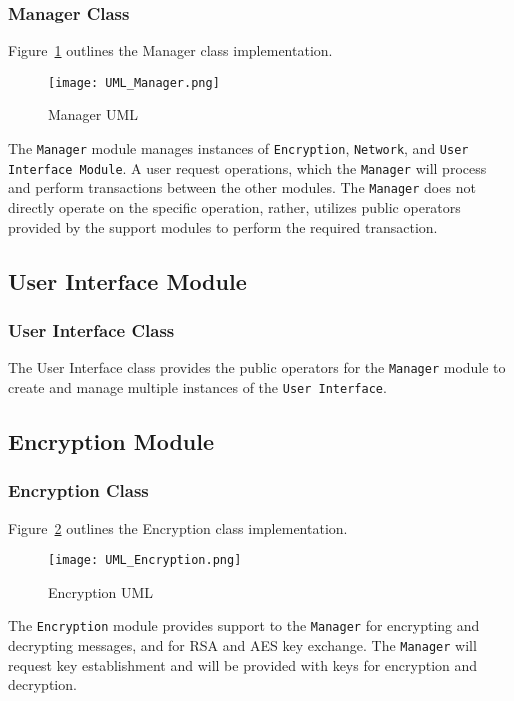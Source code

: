 \documentclass[sigconf]{acmart}
\begin{document}
\subsubsection{Manager Class}
Figure~\ref{Manager UML} outlines the Manager class implementation.
\begin{figure}[htb]
	\begin{center}
		\texttt{[image: UML\_Manager.png]}
		\caption{Manager UML}
		\label{Manager UML}
	\end{center}
\end{figure}
The \texttt{Manager} module manages instances of \texttt{Encryption}, \texttt{Network}, and
\texttt{User Interface Module}. A user request operations, which the \texttt{Manager} will
process and perform transactions between the other modules. The \texttt{Manager} does not directly
operate on the specific operation, rather, utilizes public operators provided by the support
modules to perform the required transaction.

\subsection{User Interface Module}
\subsubsection{User Interface Class}
The User Interface class provides the public operators for the \texttt{Manager} module to create
and manage multiple instances of the \texttt{User Interface}.

\subsection{Encryption Module}
\subsubsection{Encryption Class}
Figure~\ref{Encryption UML} outlines the Encryption class implementation.
\begin{figure}[htb]
	\begin{center}
		\texttt{[image: UML\_Encryption.png]}
		\caption{Encryption UML}
		\label{Encryption UML}
	\end{center}
\end{figure}
The \texttt{Encryption} module provides support to the \texttt{Manager} for encrypting and
decrypting messages, and for RSA and AES key exchange. The \texttt{Manager} will request key
establishment and will be provided with keys for encryption and decryption.
\end{document}
